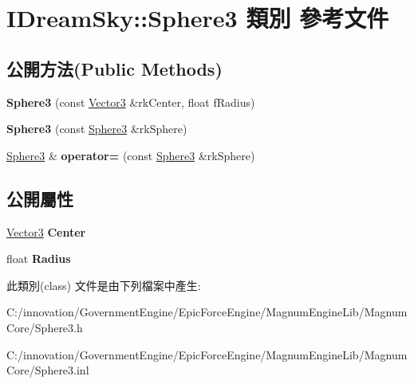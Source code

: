\hypertarget{class_i_dream_sky_1_1_sphere3}{}\section{I\+Dream\+Sky\+:\+:Sphere3 類別 參考文件}
\label{class_i_dream_sky_1_1_sphere3}
\subsection*{公開方法(Public Methods)}
\begin{DoxyCompactItemize}
\item 
{\bfseries Sphere3} (const \hyperlink{class_i_dream_sky_1_1_vector3}{Vector3} \&rk\+Center, float f\+Radius)\hypertarget{class_i_dream_sky_1_1_sphere3_a79c6676989abc7567c5f70ec5acdf6be}{}\label{class_i_dream_sky_1_1_sphere3_a79c6676989abc7567c5f70ec5acdf6be}

\item 
{\bfseries Sphere3} (const \hyperlink{class_i_dream_sky_1_1_sphere3}{Sphere3} \&rk\+Sphere)\hypertarget{class_i_dream_sky_1_1_sphere3_acb350acfbfeaa615afa62bef9b594321}{}\label{class_i_dream_sky_1_1_sphere3_acb350acfbfeaa615afa62bef9b594321}

\item 
\hyperlink{class_i_dream_sky_1_1_sphere3}{Sphere3} \& {\bfseries operator=} (const \hyperlink{class_i_dream_sky_1_1_sphere3}{Sphere3} \&rk\+Sphere)\hypertarget{class_i_dream_sky_1_1_sphere3_a0ee7373aee88a6b1388c3a444668b56f}{}\label{class_i_dream_sky_1_1_sphere3_a0ee7373aee88a6b1388c3a444668b56f}

\end{DoxyCompactItemize}
\subsection*{公開屬性}
\begin{DoxyCompactItemize}
\item 
\hyperlink{class_i_dream_sky_1_1_vector3}{Vector3} {\bfseries Center}\hypertarget{class_i_dream_sky_1_1_sphere3_ae2d91d1e3504915e7fe1a40183fcb3be}{}\label{class_i_dream_sky_1_1_sphere3_ae2d91d1e3504915e7fe1a40183fcb3be}

\item 
float {\bfseries Radius}\hypertarget{class_i_dream_sky_1_1_sphere3_afa80cf7a69bd523229d2db53fca1cede}{}\label{class_i_dream_sky_1_1_sphere3_afa80cf7a69bd523229d2db53fca1cede}

\end{DoxyCompactItemize}


此類別(class) 文件是由下列檔案中產生\+:\begin{DoxyCompactItemize}
\item 
C\+:/innovation/\+Government\+Engine/\+Epic\+Force\+Engine/\+Magnum\+Engine\+Lib/\+Magnum\+Core/Sphere3.\+h\item 
C\+:/innovation/\+Government\+Engine/\+Epic\+Force\+Engine/\+Magnum\+Engine\+Lib/\+Magnum\+Core/Sphere3.\+inl\end{DoxyCompactItemize}
